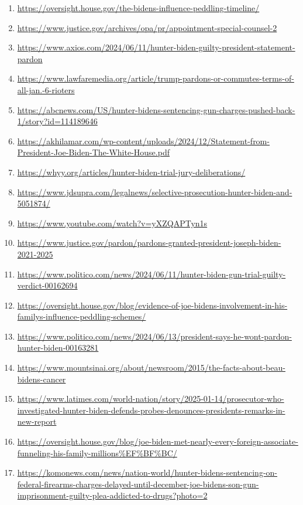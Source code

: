 \documentclass[10pt,a4paper]{article}
\begin{document}
\begin{enumerate}[leftmargin=*]
            \item \url{ https://oversight.house.gov/the-bidens-influence-peddling-timeline/ }
            \item \url{ https://www.justice.gov/archives/opa/pr/appointment-special-counsel-2 }
            \item \url{ https://www.axios.com/2024/06/11/hunter-biden-guilty-president-statement-pardon }
            \item \url{ https://www.lawfaremedia.org/article/trump-pardons-or-commutes-terms-of-all-jan.-6-rioters }
            \item \url{ https://abcnews.com/US/hunter-bidens-sentencing-gun-charges-pushed-back-1/story?id=114189646 }
            \item \url{ https://akhilamar.com/wp-content/uploads/2024/12/Statement-from-President-Joe-Biden-The-White-House.pdf }
            \item \url{ https://whyy.org/articles/hunter-biden-trial-jury-deliberations/ }
            \item \url{ https://www.jdsupra.com/legalnews/selective-prosecution-hunter-biden-and-5051874/ }
            \item \url{ https://www.youtube.com/watch?v=yXZQAPTyn1s }
            \item \url{ https://www.justice.gov/pardon/pardons-granted-president-joseph-biden-2021-2025 }
            \item \url{ https://www.politico.com/news/2024/06/11/hunter-biden-gun-trial-guilty-verdict-00162694 }
            \item \url{ https://oversight.house.gov/blog/evidence-of-joe-bidens-involvement-in-his-familys-influence-peddling-schemes/ }
            \item \url{ https://www.politico.com/news/2024/06/13/president-says-he-wont-pardon-hunter-biden-00163281 }
            \item \url{ https://www.mountsinai.org/about/newsroom/2015/the-facts-about-beau-bidens-cancer }
            \item \url{ https://www.latimes.com/world-nation/story/2025-01-14/prosecutor-who-investigated-hunter-biden-defends-probes-denounces-presidents-remarks-in-new-report }
            \item \url{ https://oversight.house.gov/blog/joe-biden-met-nearly-every-foreign-associate-funneling-his-family-millions\%EF\%BF\%BC/ }
            \item \url{ https://komonews.com/news/nation-world/hunter-bidens-sentencing-on-federal-firearms-charges-delayed-until-december-joe-bidens-son-gun-imprisonment-guilty-plea-addicted-to-drugs?photo=2 }

\end{enumerate}
\end{document}
